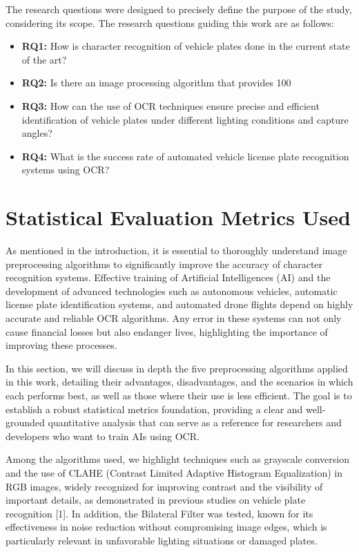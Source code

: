 \documentclass[conference]{IEEEtran}
\begin{document}
    The research questions were designed to precisely define the purpose of the study, considering its scope. The research questions guiding this work are as follows:
    
    \begin{itemize}
        \item \textbf{RQ1:} How is character recognition of vehicle plates done in the current state of the art?
        \item \textbf{RQ2:} Is there an image processing algorithm that provides 100%
        \item \textbf{RQ3:} How can the use of OCR techniques ensure precise and efficient identification of vehicle plates under different lighting conditions and capture angles?
        \item \textbf{RQ4:} What is the success rate of automated vehicle license plate recognition systems using OCR?
    \end{itemize}
    
    \section{Statistical Evaluation Metrics Used}
    
    As mentioned in the introduction, it is essential to thoroughly understand image preprocessing algorithms to significantly improve the accuracy of character recognition systems. Effective training of Artificial Intelligences (AI) and the development of advanced technologies such as autonomous vehicles, automatic license plate identification systems, and automated drone flights depend on highly accurate and reliable OCR algorithms. Any error in these systems can not only cause financial losses but also endanger lives, highlighting the importance of improving these processes.
    
    In this section, we will discuss in depth the five preprocessing algorithms applied in this work, detailing their advantages, disadvantages, and the scenarios in which each performs best, as well as those where their use is less efficient. The goal is to establish a robust statistical metrics foundation, providing a clear and well-grounded quantitative analysis that can serve as a reference for researchers and developers who want to train AIs using OCR.
    
    Among the algorithms used, we highlight techniques such as grayscale conversion and the use of CLAHE (Contrast Limited Adaptive Histogram Equalization) in RGB images, widely recognized for improving contrast and the visibility of important details, as demonstrated in previous studies on vehicle plate recognition [1]. In addition, the Bilateral Filter was tested, known for its effectiveness in noise reduction without compromising image edges, which is particularly relevant in unfavorable lighting situations or damaged plates.
    
\end{document}
